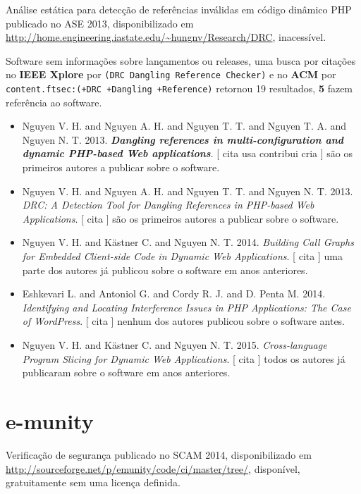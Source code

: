 Análise estática para detecção de referências inválidas em código dinâmico PHP
publicado no ASE 2013,
disponibilizado em \url{http://home.engineering.iastate.edu/~hungnv/Research/DRC},
inacessível.

Software sem informações sobre lançamentos ou releases,
uma busca por citações no {\bf IEEE Xplore} por
\texttt{(DRC Dangling Reference Checker)}
e no {\bf ACM} por
\texttt{content.ftsec:(+DRC +Dangling +Reference)}
retornou
19 resultados,
{\bf 5} fazem referência ao software.

\begin{itemize}
\item Nguyen V. H. and Nguyen A. H. and Nguyen T. T. and Nguyen T. A. and Nguyen N. T.
      2013.
        \textbf{\textit{ Dangling references in multi-configuration and dynamic PHP-based Web applications}}.
      [
          cita
          usa
          contribui
          cria
      ]
são os primeiros autores a publicar sobre o software.
\item Nguyen V. H. and Nguyen A. H. and Nguyen T. T. and Nguyen N. T.
      2013.
        \textit{ DRC: A Detection Tool for Dangling References in PHP-based Web Applications}.
      [
          cita
      ]
são os primeiros autores a publicar sobre o software.
\item Nguyen V. H. and K\"{a}stner C. and Nguyen N. T.
      2014.
        \textit{ Building Call Graphs for Embedded Client-side Code in Dynamic Web Applications}.
      [
          cita
      ]
uma parte dos autores já publicou sobre o software em anos anteriores.
\item Eshkevari L. and Antoniol G. and Cordy R. J. and D. Penta M.
      2014.
        \textit{ Identifying and Locating Interference Issues in PHP Applications: The Case of WordPress}.
      [
          cita
      ]
nenhum dos autores publicou sobre o software antes.
\item Nguyen V. H. and K\"{a}stner C. and Nguyen N. T.
      2015.
        \textit{ Cross-language Program Slicing for Dynamic Web Applications}.
      [
          cita
      ]
todos os autores já publicaram sobre o software em anos anteriores.
\end{itemize}
\section{e-munity}

Verificação de segurança
publicado no SCAM 2014,
disponibilizado em \url{http://sourceforge.net/p/emunity/code/ci/master/tree/},
disponível,
gratuitamente
sem uma licença definida.

